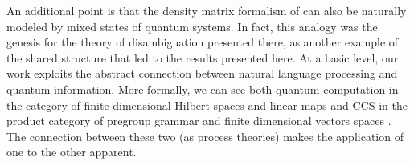An additional point is that the density matrix formalism of \cite{piedeleu2015open} can also be naturally modeled by mixed states of quantum systems.  In fact, this analogy was the genesis for the theory of disambiguation presented there, as another example of the shared structure that led to the results presented here. At a basic level, our work exploits the abstract connection between natural language processing and quantum information.  More formally,  we can see both quantum computation in the category of finite dimensional Hilbert spaces and linear maps \cite{abramsky2004categorical,cqm-notes} and CCS in the product category of pregroup grammar and finite dimensional vectors spaces \cite{coecke2010mathematical}. The connection between these two (as process theories) makes the application of one to the other apparent.
